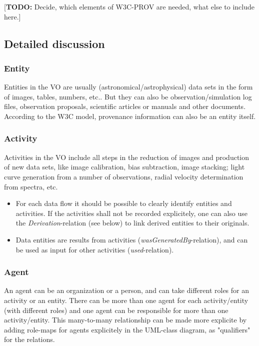 \documentclass[11pt,a4paper]{ivoa}
\newcommand{\TODO}[1]{\noindent \textcolor{todocolor}{[\textbf{TODO:} #1]}}
\begin{document}
\TODO{Decide, which elements of W3C-PROV are needed, what else to include here.}


\subsection{Detailed discussion}

\subsubsection{Entity}
Entities in the VO are usually (astronomical/astrophysical) data sets in the form of images, tables, numbers, etc.. But they can also be observation/simulation log files, observation proposals, scientific articles or manuals and other documents. According to the W3C model,  provenance information can also be an entity itself. 

\subsubsection{Activity}
Activities in the VO include all steps in the reduction of images and production of new data sets, like image calibration, bias subtraction, image stacking; light curve generation from a number of observations, radial velocity determination from spectra, etc.

\begin{itemize}
\item For each data flow it should be possible to clearly identify entities and activities. If the activities shall not be recorded explicitely, one can also use the \emph{Derivation}-relation (see below) to link derived entities to their originals.

\item Data entities are results from activities (\emph{wasGeneratedBy}-relation), and can be used as input for other activities (\emph{used}-relation). 

\end{itemize}

\subsubsection{Agent}
An agent can be an organization or a person, and can take different roles for an activity or an entity. 
There can be more than one agent for each activity/entity (with different roles) and one agent can be responsible for more than one activity/entity. This many-to-many relationship can be made more explicite by adding role-maps for agents explicitely in the UML-class diagram, as "qualifiers" 
for the relations. 
\end{document}
